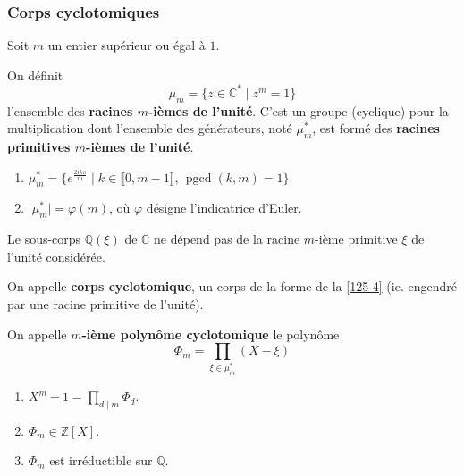   \subsubsection{Corps cyclotomiques}

  Soit $m$ un entier supérieur ou égal à $1$.


  \begin{definition}
    On définit
    \[ \mu_m = \{ z \in \mathbb{C}^* \mid z^m = 1 \} \]
    l'ensemble des \textbf{racines $m$-ièmes de l'unité}. C'est un groupe (cyclique) pour la multiplication dont l'ensemble des générateurs, noté $\mu_m^*$, est formé des \textbf{racines primitives $m$-ièmes de l'unité}.
  \end{definition}

  \begin{proposition}
    \begin{enumerate}[label={\bfseries(\roman*)}]
      \item $\mu_m^* = \{ e^{\frac{2ik\pi}{m}} \mid k \in \llbracket 0, m-1 \rrbracket, \, \operatorname{pgcd}(k, m) = 1 \}$.
      \item $\vert \mu_m^* \vert = \varphi(m)$, où $\varphi$ désigne l'indicatrice d'Euler.
    \end{enumerate}
  \end{proposition}

  \begin{proposition}
    \label{125-4}
    Le sous-corps $\mathbb{Q}(\xi)$ de $\mathbb{C}$ ne dépend pas de la racine $m$-ième primitive $\xi$ de l'unité considérée.
  \end{proposition}

  \begin{definition}
    On appelle \textbf{corps cyclotomique}, un corps de la forme de la \cref{125-4} (ie. engendré par une racine primitive de l'unité).
  \end{definition}

  \begin{definition}
    On appelle \textbf{$m$-ième polynôme cyclotomique} le polynôme
    \[ \Phi_m = \prod_{\xi \in \mu_m^*} (X - \xi) \]
  \end{definition}

  \begin{theorem}
    \begin{enumerate}[label={\bfseries(\roman*)}]
      \item $X^m - 1 = \prod_{d \mid m} \Phi_d$.
      \item $\Phi_m \in \mathbb{Z}[X]$.
      \item $\Phi_m$ est irréductible sur $\mathbb{Q}$.
    \end{enumerate}
  \end{theorem}

